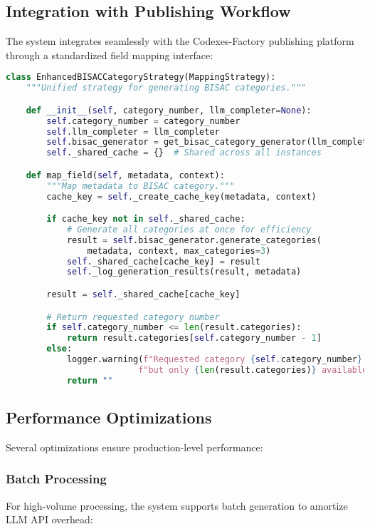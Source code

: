 \documentclass{article}
\begin{document}
\subsection{Integration with Publishing Workflow}

The system integrates seamlessly with the Codexes-Factory publishing platform through a standardized field mapping interface:

\begin{lstlisting}[language=python, caption=Publishing Workflow Integration]
class EnhancedBISACCategoryStrategy(MappingStrategy):
    """Unified strategy for generating BISAC categories."""

    def __init__(self, category_number, llm_completer=None):
        self.category_number = category_number
        self.llm_completer = llm_completer
        self.bisac_generator = get_bisac_category_generator(llm_completer)
        self._shared_cache = {}  # Shared across all instances

    def map_field(self, metadata, context):
        """Map metadata to BISAC category."""
        cache_key = self._create_cache_key(metadata, context)

        if cache_key not in self._shared_cache:
            # Generate all categories at once for efficiency
            result = self.bisac_generator.generate_categories(
                metadata, context, max_categories=3)
            self._shared_cache[cache_key] = result
            self._log_generation_results(result, metadata)

        result = self._shared_cache[cache_key]

        # Return requested category number
        if self.category_number <= len(result.categories):
            return result.categories[self.category_number - 1]
        else:
            logger.warning(f"Requested category {self.category_number} "
                          f"but only {len(result.categories)} available")
            return ""
\end{lstlisting}

\subsection{Performance Optimizations}

Several optimizations ensure production-level performance:

\subsubsection{Batch Processing}
For high-volume processing, the system supports batch generation to amortize LLM API overhead:
\end{document}
